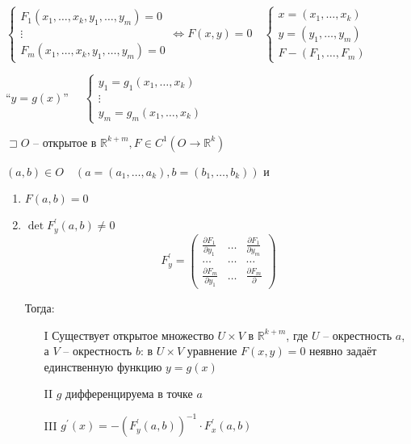 \documentclass{book}
\newcommand\R{\ensuremath{\mathbb{R}}}
\newcommand{\p}[1]{#1^{\prime}}
\theoremstyle{definition}
\begin{document}
         $\begin{cases}
             F_1\left( x_1, \ldots, x_{k} ,y_1, \ldots, y_m  \right)  = 0\\
             \vdots\\
             F_m\left( x_1, \ldots, x_k, y_1, \ldots, y_m \right)  = 0
         \end{cases} \iff  F(x,y) = 0\quad \begin{cases}
         x = \left( x_1, \ldots, x_k \right) \\
         y = (y_1, \ldots, y_m)\\
         F - \left( F_1, \ldots, F_m \right) 
         
         \end{cases}$

         ``$y = g(x)$''  $\quad \begin{cases}
             y_1 = g_1\left( x_1, \ldots, x_k \right) \\
             \vdots\\
             y_m = g_m\left( x_1, \ldots, x_k \right) 
         \end{cases}$

        \begin{theorem}
            $\sqsupset O$ -- открытое в $\R^{k+m}, F\in C^1\left( O \to  \R^k \right) $

            $(a, b)\in O\quad \left( a = \left( a_1, \ldots, a_k \right) , b = \left( b_1, \ldots, b_k \right)  \right) $ и 
            \begin{enumerate}
                \item $F(a,b) = 0$ 
                \item $\det \p F_y\left( a,b \right) \neq 0$ \[\p F_y = \begin{pmatrix} \frac{\partial F_1}{\partial y_1} &\ldots& \frac{\partial F_1}{\partial y_m}\\ \ldots&\ldots&\ldots\\ \frac{\partial F_m}{\partial y_1}& \ldots& \frac{\partial F_m}{\partial } \end{pmatrix} \]

                    Тогда:
                    \begin{enumerate}
                        \item [I] Существует открытое множество $U\times V$ в $\R^{k+m}$, где $U$ -- окрестность  $a$, а $V$ -- окрестность $b$: в  $U\times V$ уравнение $F(x,y) = 0$ неявно задаёт единственную функцию  $y = g\left( x \right) $
                        \item [II] $g$ дифференцируема в точке  $a$
                        \item [III]  $\p g(x) = -\left( \p F_{y}(a,b) \right) ^{-1} \cdot  \p F_x(a,b)$
                    \end{enumerate}
            \end{enumerate}
        \end{theorem}
\end{document}
